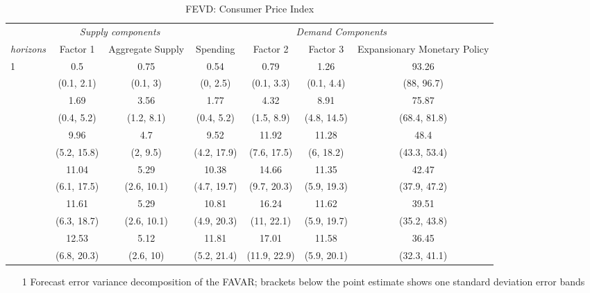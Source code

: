 \begin{table}\caption{ FEVD: Consumer Price Index }\begin{adjustbox}{max width=\linewidth} 
\begin{tabular}{lcccccc}
\toprule 
 & \multicolumn{2}{c}{\textit{Supply components}} & \multicolumn{4}{c}{\textit{Demand Components}} \\ 
 \cmidrule(l){2-3} \cmidrule(l){4-7} 
\textit{horizons} & Factor 1 & Aggregate Supply & Spending & Factor 2 & Factor 3 & Expansionary Monetary Policy \\ 
\midrule 
1 & 0.5 & 0.75 & 0.54 & 0.79 & 1.26 & 93.26 \\ 
  & (0.1, 2.1) & (0.1, 3) & (0, 2.5) & (0.1, 3.3) & (0.1, 4.4) & (88, 96.7) \\ 
\addlinespace 
2 & 1.69 & 3.56 & 1.77 & 4.32 & 8.91 & 75.87 \\ 
  & (0.4, 5.2) & (1.2, 8.1) & (0.4, 5.2) & (1.5, 8.9) & (4.8, 14.5) & (68.4, 81.8) \\ 
\addlinespace 
3 & 9.96 & 4.7 & 9.52 & 11.92 & 11.28 & 48.4 \\ 
  & (5.2, 15.8) & (2, 9.5) & (4.2, 17.9) & (7.6, 17.5) & (6, 18.2) & (43.3, 53.4) \\ 
\addlinespace 
6 & 11.04 & 5.29 & 10.38 & 14.66 & 11.35 & 42.47 \\ 
  & (6.1, 17.5) & (2.6, 10.1) & (4.7, 19.7) & (9.7, 20.3) & (5.9, 19.3) & (37.9, 47.2) \\ 
\addlinespace 
12 & 11.61 & 5.29 & 10.81 & 16.24 & 11.62 & 39.51 \\ 
  & (6.3, 18.7) & (2.6, 10.1) & (4.9, 20.3) & (11, 22.1) & (5.9, 19.7) & (35.2, 43.8) \\ 
\addlinespace 
24 & 12.53 & 5.12 & 11.81 & 17.01 & 11.58 & 36.45 \\ 
  & (6.8, 20.3) & (2.6, 10) & (5.2, 21.4) & (11.9, 22.9) & (5.9, 20.1) & (32.3, 41.1) \\ 
\bottomrule 
\end{tabular} 
\end{adjustbox}
\begin{minipage}{\textwidth} 
{\footnotesize
\begin{enumerate}
\vspace{2mm}
    \item[1] Forecast error variance decomposition of the FAVAR; brackets below the point estimate shows one standard deviation error bands
\end{enumerate}}
     \end{minipage}
\end{table}
